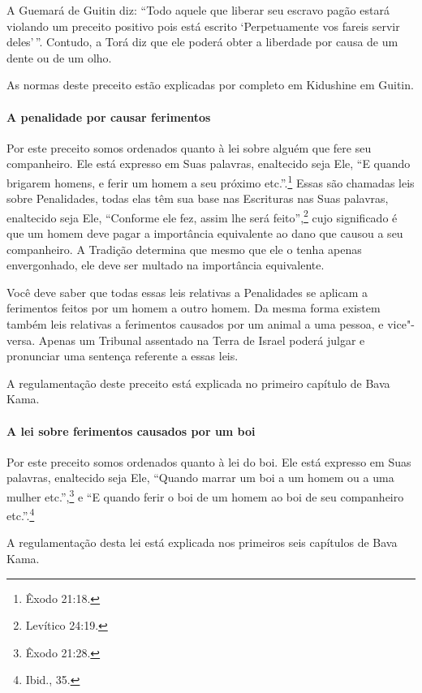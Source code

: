 \begin{multicols}{2}
A Guemará\starr{} de Guitin\starr{} diz: ``Todo aquele que liberar seu escravo pagão
estará violando um preceito positivo pois está escrito `Perpetuamente
vos fareis servir deles'\,''. Contudo, a Torá\starr{} diz que ele poderá obter a
liberdade por causa de um dente ou de um olho.

As normas deste preceito estão explicadas por completo em Kidushin\starr e em
Guitin\starr.

\paragraph{A penalidade por causar ferimentos}

Por este preceito somos ordenados quanto à lei sobre alguém que fere seu
companheiro. Ele está expresso em Suas palavras, enaltecido seja Ele,
``E quando brigarem homens, e ferir um homem a seu próximo etc.''.\footnote{Êxodo
21:18.} Essas são chamadas leis sobre Penalidades, todas elas têm sua
base nas Escrituras nas Suas palavras, enaltecido seja Ele, ``Conforme
ele fez, assim lhe será feito'',\footnote{Levítico 24:19.} cujo significado é que
um homem deve pagar a importância equivalente ao dano que causou a seu
companheiro. A Tradição determina que mesmo que ele o tenha apenas
envergonhado, ele deve ser multado na importância equivalente.

Você deve saber que todas essas leis relativas a Penalidades se aplicam
a ferimentos feitos por um homem a outro homem. Da mesma forma existem também leis relativas a ferimentos causados por um animal a uma
pessoa, e vice"-versa. Apenas um Tribunal assentado na Terra de Israel
poderá julgar e pronunciar uma sentença referente a essas leis.

A regulamentação deste preceito está explicada no primeiro capítulo de
Bava Kama\starr.

\paragraph{A lei sobre ferimentos causados por um boi}

Por este preceito somos ordenados quanto à lei do boi. Ele está
expresso em Suas palavras, enaltecido seja Ele, ``Quando marrar um boi
a um homem ou a uma mulher etc.'',\footnote{Êxodo 21:28.} e ``E quando ferir o
boi de um homem ao boi de seu companheiro etc.''.\footnote{Ibid., 35.}

A regulamentação desta lei está explicada nos primeiros seis capítulos
de Bava Kama\starr.


\end{multicols}
